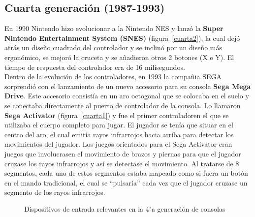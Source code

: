 
\subsection{Cuarta generaci\'on (1987-1993)}


En 1990 Nintendo hizo evolucionar a la Nintendo NES y lanz\'o la \textbf{Super Nintendo Entertainment System (SNES)} (figura~\ref{cuarta2}), la cual dej\'o atr\'as un dise\~no cuadrado del controlador y se inclin\'o por un dise\~no m\'as ergon\'omico, se mejor\'o la cruceta y se a\~nadieron otros 2 botones (X e Y). El tiempo de respuesta del controlador era de 16 milisegundos. \\

Dentro de la evoluci\'on de los controladores, en 1993 la compa\~nia SEGA sorprendi\'o con el lanzamiento de un nuevo accesorio para su consola \textbf{Sega Mega Drive}. Este accesorio consist\'ia en un aro octogonal que se colocaba en el suelo y se conectaba directamente al puerto de controlador de la consola. Lo llamaron \textbf{Sega Activator} (figura~\ref{cuarta1}) y fue el primer controladoren el que se utilizaba el cuerpo completo para jugar. El jugador se ten\'ia que situar en el centro del aro, el cual emit\'ia rayos infrarrojos hacia arriba para detectar los movimientos del jugador. Los juegos orientados para el Sega Activator eran juegos que involucrasen el movimiento de brazos y piernas para que el jugador cruzase los rayos infrarrojos y as\'i se detectase el movimiento. Al tratarse de 8 segmentos, cada uno de estos segmentos estaba mapeado como si fuera un bot\'on en el mando tradicional, el cual se ``pulsar\'ia'' cada vez que el jugador cruzase un segmento de los rayos infrarrojos. \\

\begin{figure}[t]
     \hfill
{}
     \caption{Dispositivos de entrada relevantes en la 4"a  generaci\'on de consolas}
     \label{fig:cuarta}
   \end{figure}

